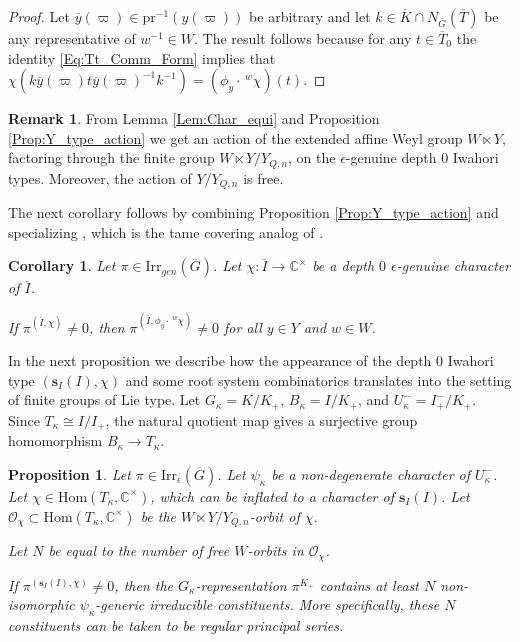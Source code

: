 \documentclass[11pt]{amsart}
\theoremstyle{plain}
\newtheorem{Cor}[equation]{Corollary}
\newtheorem{Prop}[equation]{Proposition}
\theoremstyle{definition}
\newtheorem*{Rmk}{Remark}
\numberwithin{equation}{section}
\newcommand{\C}{\mathbb{C}}
\newcommand{\Gt}{\overline{G}}
\newcommand{\It}{\overline{I}}
\newcommand{\Kt}{\overline{K}}
\newcommand{\Tt}{\overline{T}}
\newcommand{\Yt}{Y_{Q,n}}
\newcommand{\yt}{\overline{y}}
\newcommand{\s}{\mathbf{s}}
\newcommand{\Ocal}{\mathcal{O}}
\begin{document}
\begin{proof}
    Let $\yt(\varpi)\in \mathrm{pr}^{-1}(y(\varpi))$ be arbitrary and let $k\in \Kt\cap N_{\Gt}(\Tt)$ be any representative of $w^{-1}\in W$. The result follows because for any $t\in \Tt_{0}$ the identity \eqref{Eq:Tt_Comm_Form} implies that $\chi(k\yt(\varpi)t\yt(\varpi)^{-1}k^{-1}) = (\phi_{y}\cdot \,^{w}\chi)(t)$.
\end{proof}

\begin{Rmk}
    From Lemma \ref{Lem:Char_equi} and Proposition \ref{Prop:Y_type_action} we get an action of the extended affine Weyl group $W\ltimes Y$, factoring through the finite group $W\ltimes Y/\Yt$, on the $\epsilon$-genuine depth $0$ Iwahori types. Moreover, the action of $Y/\Yt$ is free.
\end{Rmk}

The next corollary follows by combining Proposition \ref{Prop:Y_type_action} and specializing \cite[Proposition 3.7]{HW09}, which is the tame covering analog of \cite[Proposition 6.2]{MP96}.

\begin{Cor}\label{Cor:Translate_Types}
    Let $\pi\in\mathrm{Irr}_{gen}(\Gt)$. Let $\chi:\It\rightarrow \C^{\times}$ be a depth $0$ $\epsilon$-genuine character of $\It$.
    
    If $\pi^{(\It,\chi)}\neq 0$, then $\pi^{(\It,\phi_{y}\cdot \,^{w}\chi)}\neq 0$ for all $y\in Y$ and $w\in W$.
\end{Cor}

In the next proposition we describe how the appearance of the depth $0$ Iwahori type $(\s_{I}(I),\chi)$ and some root system combinatorics translates into the setting of finite groups of Lie type. Let $G_{\kappa}= K/K_{+}$, $B_{\kappa} = I/K_{+}$, and $U^{-}_{\kappa} = I^{-}_{+}/K_{+}$. Since $T_{\kappa}\cong I/I_{+}$, the natural quotient map gives a surjective group homomorphism $B_{\kappa}\rightarrow T_{\kappa}$.

\begin{Prop}\label{Prop:Finite_Generic}
    Let $\pi\in\mathrm{Irr}_{\epsilon}(\Gt)$. Let $\psi_{\kappa}$ be a non-degenerate character of $U^{-}_{\kappa}$. Let $\chi\in\mathrm{Hom}(T_{\kappa},\C^{\times})$, which can be inflated to a character of $\s_{I}(I)$. Let $\Ocal_{\chi}\subset \mathrm{Hom}(T_{\kappa},\C^{\times})$ be the $W\ltimes Y/\Yt$-orbit of $\chi$. 

    Let $N$ be equal to the number of free $W$-orbits in $\Ocal_{\chi}$.

    If $\pi^{(\s_{I}(I),\chi)}\neq 0$, then the $G_{\kappa}$-representation $\pi^{K_{+}}$ contains at least $N$ non-isomorphic $\psi_{\kappa}$-generic irreducible constituents. More specifically, these $N$ constituents can be taken to be regular principal series.
\end{Prop}
\end{document}
